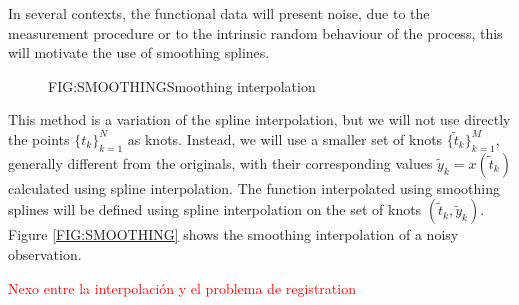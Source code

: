 In several contexts, the functional data will present noise, due to the
measurement procedure or to the intrinsic random behaviour of the process,
this will motivate the use of smoothing splines.

\begin{figure}[Example of smoothing]{FIG:SMOOTHING}{Smoothing interpolation}
	 \quad
\end{figure}

This method is a variation of the spline interpolation, but we will not
use directly the points $\{t_k\}_{k=1}^{N}$ as knots. Instead, we will use a
smaller set of knots $\{\tilde t_k\}_{k=1}^{M}$, generally different from the
originals, with their corresponding values $\tilde y_k = x(\tilde t_k)$
calculated using spline interpolation. The function interpolated using smoothing
splines will be defined using spline interpolation on the set of knots
$(\tilde t_k, \tilde y_k)$. Figure \ref{FIG:SMOOTHING} shows the smoothing
interpolation of a noisy observation.


\textcolor{red}{Nexo entre la interpolación y el problema de registration}
